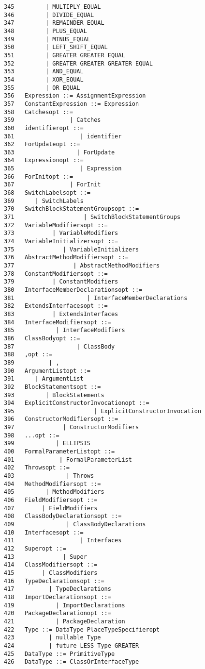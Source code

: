 {\begin{verbatim}
345         | MULTIPLY_EQUAL
346         | DIVIDE_EQUAL
347         | REMAINDER_EQUAL
348         | PLUS_EQUAL
349         | MINUS_EQUAL
350         | LEFT_SHIFT_EQUAL
351         | GREATER GREATER EQUAL
352         | GREATER GREATER GREATER EQUAL
353         | AND_EQUAL
354         | XOR_EQUAL
355         | OR_EQUAL
356   Expression ::= AssignmentExpression
357   ConstantExpression ::= Expression
358   Catchesopt ::=
359                | Catches
360   identifieropt ::=
361                   | identifier
362   ForUpdateopt ::=
363                  | ForUpdate
364   Expressionopt ::=
365                   | Expression
366   ForInitopt ::=
367                | ForInit
368   SwitchLabelsopt ::=
369      | SwitchLabels
370   SwitchBlockStatementGroupsopt ::=
371                    | SwitchBlockStatementGroups
372   VariableModifiersopt ::=
373           | VariableModifiers
374   VariableInitializersopt ::=
375              | VariableInitializers
376   AbstractMethodModifiersopt ::=
377                 | AbstractMethodModifiers
378   ConstantModifiersopt ::=
379           | ConstantModifiers
380   InterfaceMemberDeclarationsopt ::=
381                     | InterfaceMemberDeclarations
382   ExtendsInterfacesopt ::=
383           | ExtendsInterfaces
384   InterfaceModifiersopt ::=
385            | InterfaceModifiers
386   ClassBodyopt ::=
387                  | ClassBody
388   ,opt ::=
389          | ,
390   ArgumentListopt ::=
391      | ArgumentList
392   BlockStatementsopt ::=
393         | BlockStatements
394   ExplicitConstructorInvocationopt ::=
395                       | ExplicitConstructorInvocation
396   ConstructorModifiersopt ::=
397              | ConstructorModifiers
398   ...opt ::=
399            | ELLIPSIS
400   FormalParameterListopt ::=
401             | FormalParameterList
402   Throwsopt ::=
403               | Throws
404   MethodModifiersopt ::=
405         | MethodModifiers
406   FieldModifiersopt ::=
407        | FieldModifiers
408   ClassBodyDeclarationsopt ::=
409               | ClassBodyDeclarations
410   Interfacesopt ::=
411                   | Interfaces
412   Superopt ::=
413              | Super
414   ClassModifiersopt ::=
415        | ClassModifiers
416   TypeDeclarationsopt ::=
417          | TypeDeclarations
418   ImportDeclarationsopt ::=
419            | ImportDeclarations
420   PackageDeclarationopt ::=
421            | PackageDeclaration
422   Type ::= DataType PlaceTypeSpecifieropt
423          | nullable Type
424          | future LESS Type GREATER
425   DataType ::= PrimitiveType
426   DataType ::= ClassOrInterfaceType

\end{verbatim}}
